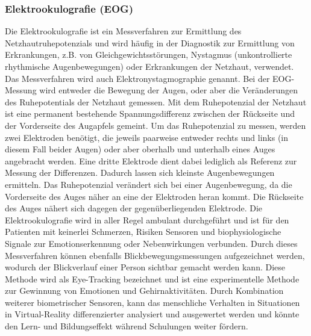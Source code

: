 \subsubsection{Elektrookulografie (EOG)} \label{grund-eog-subsubsec}


Die Elektrookulografie ist ein Messverfahren zur Ermittlung des Netzhautruhepotenzials und wird häufig in der Diagnostik zur Ermittlung von Erkrankungen, z.B. von Gleichgewichtsstörungen, Nystagmus (unkontrollierte rhythmische Augenbewegungen) oder Erkrankungen der Netzhaut, verwendet. Das Messverfahren wird auch Elektronystagmographie genannt. Bei der EOG-Messung  wird entweder die Bewegung der Augen, oder aber die Veränderungen des Ruhepotentials der Netzhaut gemessen. Mit dem Ruhepotenzial der Netzhaut ist eine permanent bestehende Spannungsdifferenz zwischen der Rückseite und der Vorderseite des Augapfels gemeint. Um das Ruhepotenzial zu messen, werden zwei Elektroden benötigt, die jeweils paarweise entweder rechts und links (in diesem Fall beider Augen) oder aber oberhalb und unterhalb eines Auges angebracht werden. Eine dritte Elektrode dient dabei lediglich als Referenz zur Messung der Differenzen. Dadurch lassen sich kleinste Augenbewegungen ermitteln. Das Ruhepotenzial verändert sich bei einer Augenbewegung, da die Vorderseite des Auges näher an eine der Elektroden heran kommt. Die Rückseite des Auges nähert sich dagegen der gegenüberliegenden Elektrode. Die Elektrookulografie wird in aller Regel ambulant durchgeführt und ist für den Patienten mit keinerlei Schmerzen, Risiken Sensoren und biophysiologische Signale zur Emotionserkennung oder Nebenwirkungen verbunden. Durch dieses Messverfahren können ebenfalls Blickbewegungsmessungen aufgezeichnet werden, wodurch der Blickverlauf einer Person sichtbar gemacht werden kann. Diese Methode wird als Eye-Tracking bezeichnet und ist eine experimentelle Methode zur Gewinnung von Emotionen und Gehirnaktivitäten. Durch Kombination weiterer biometrischer Sensoren, kann das menschliche Verhalten in Situationen in Virtual-Reality differenzierter analysiert und ausgewertet werden und könnte den Lern- und Bildungseffekt während Schulungen weiter fördern.